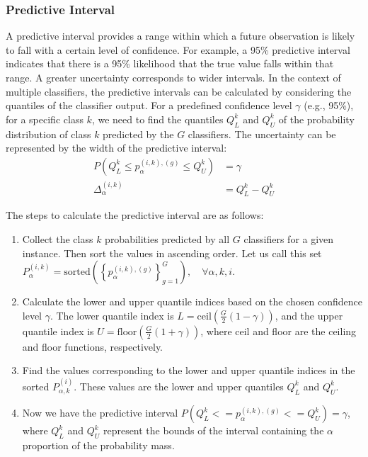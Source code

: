 \subsubsection{Predictive Interval}
A predictive interval provides a range within which a future observation is likely to fall with a certain level of confidence. For example, a 95\% predictive interval indicates that there is a 95\% likelihood that the true value falls within that range. A greater uncertainty corresponds to wider intervals. In the context of multiple classifiers, the predictive intervals can be calculated by considering the quantiles of the classifier output. For a predefined confidence level $\gamma $ (e.g., 95\%), for a specific class $k $, we need to find the quantiles $Q_{L}^{k} $ and $Q_{U}^{k} $ of the probability distribution of class $k $ predicted by the $G $ classifiers. The uncertainty can be represented by the width of the predictive interval:
\begin{align}
    P\left(Q_L^{k} \leq p_{\alpha}^{(i,k),(g)} \leq Q_U^{k}\right) & = \gamma
    \\
    \Delta_{\alpha}^{(i,k)} & = Q_L^{k} - Q_U^{k}
    \label{eq:crowd.Eq.uncertainty}
\end{align}

The steps to calculate the predictive interval are as follows:
\begin{enumerate}
    \item Collect the class $k $ probabilities predicted by all $G$ classifiers for a given instance. Then sort the values in ascending order. Let us call this set $P_{\alpha}^{(i,k)}=\mathrm{sorted}\left({\left\{p_{\alpha}^{(i,k),(g)}\right\}}_{g=1}^G\right),\quad\forall \alpha,k,i $.
    \item Calculate the lower and upper quantile indices based on the chosen confidence level $\gamma $. The lower quantile index is $L=\mathrm{ceil}\left(\frac{G}{2}\left(1-\gamma\right)\right) $, and the upper quantile index is $U=\mathrm{floor}\left(\frac{G}{2} (1+\gamma)\right) $, where ceil and floor are the ceiling and floor functions, respectively.
    \item Find the values corresponding to the lower and upper quantile indices in the sorted $P_{\alpha,k}^{(i)} $. These values are the lower and upper quantiles $Q_L^{k} $ and $Q_U^{k} $.
    \item Now we have the predictive interval $P\left(Q_L^{k}<=p_{\alpha}^{(i,k),(g)}<=Q_U^{k}\right)=\gamma $, where $Q_L^{k} $ and $Q_U^{k} $ represent the bounds of the interval containing the $\alpha$ proportion of the probability mass.
\end{enumerate}

